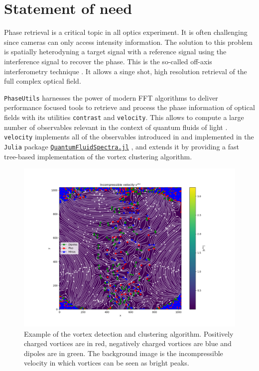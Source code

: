 \documentclass[aps,prl,groupedaddress,amsmath,amssymb]{revtex4-2}
\begin{document}
\section{Statement of need}\label{statement-of-need}

Phase retrieval is a critical topic in all optics experiment. It is
often challenging since cameras can only access intensity information.
The solution to this problem is spatially heterodyning a target signal
with a reference signal using the interference signal to recover the
phase. 
This is the so-called off-axis interferometry technique
\cite{verrierOffaxisDigitalHologram2011}. 
It allows a singe shot, high
resolution retrieval of the full complex optical field.

\texttt{PhaseUtils} harnesses the power of modern FFT algorithms to
deliver performance focused tools to retrieve and process the phase
information of optical fields with its utilities \texttt{contrast} and
\texttt{velocity}. 
This allows to compute a large number of observables
relevant in the context of quantum fluids of light
\cite{aladjidiFullOpticalControl2023, glorieuxHotAtomicVapors2023,bakerrasooliTurbulentDynamicsTwodimensional2023}.
\texttt{velocity} implements all of the observables introduced in
\cite{bradleyEnergySpectraVortex2012} and implemented in the
\texttt{Julia} package
\href{https://github.com/AshtonSBradley/QuantumFluidSpectra.jl}{\texttt{QuantumFluidSpectra.jl}}
\cite{PhysRevA.106.043322}, and extends it by providing a fast
tree-based implementation of the vortex clustering algorithm.

\begin{figure}
\centering
\includegraphics[width=\linewidth]{clusters.png}
\caption{Example of the vortex detection and clustering algorithm.
Positively charged vortices are in red, negatively charged vortices are
blue and dipoles are in green. The background image is the
incompressible velocity in which vortices can be seen as bright
peaks.\label{fig:clusters}}
\end{figure}
\end{document}
